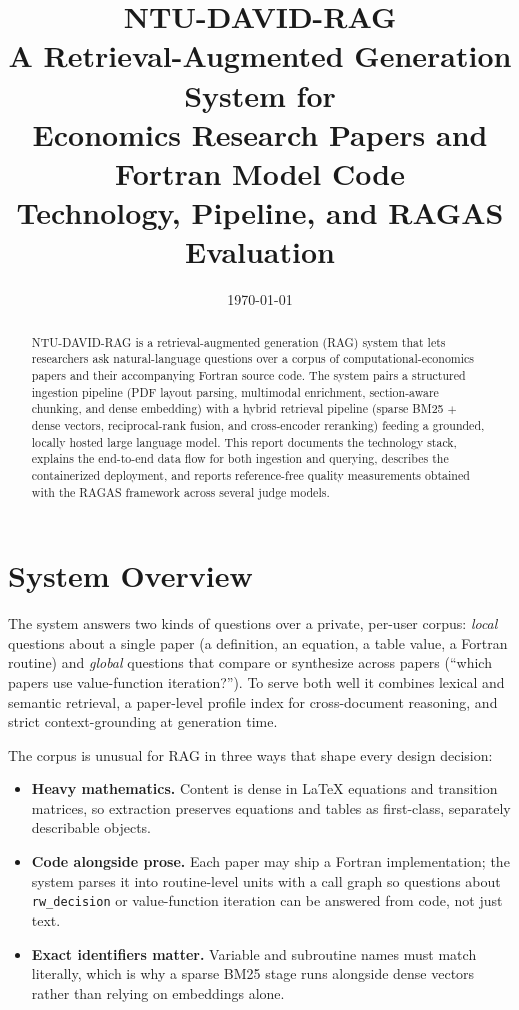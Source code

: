 \documentclass[11pt,a4paper]{article}
\title{\vspace{-1.2cm}\textbf{\color{accent}NTU-DAVID-RAG}\\[2pt]
       \large A Retrieval-Augmented Generation System for\\
       Economics Research Papers and Fortran Model Code\\[6pt]
       \normalsize Technology, Pipeline, and RAGAS Evaluation}
\author{}
\date{\today}
\newcommand{\code}[1]{\texttt{\small #1}}
\begin{document}
\maketitle
\vspace{-1.0cm}

\begin{abstract}
\noindent
NTU-DAVID-RAG is a retrieval-augmented generation (RAG) system that lets
researchers ask natural-language questions over a corpus of computational-economics
papers and their accompanying Fortran source code. The system pairs a structured
ingestion pipeline (PDF layout parsing, multimodal enrichment, section-aware
chunking, and dense embedding) with a hybrid retrieval pipeline (sparse BM25
$+$ dense vectors, reciprocal-rank fusion, and cross-encoder reranking) feeding a
grounded, locally hosted large language model. This report documents the
technology stack, explains the end-to-end data flow for both ingestion and
querying, describes the containerized deployment, and reports reference-free
quality measurements obtained with the RAGAS framework across several judge
models.
\end{abstract}

\tableofcontents
\vspace{0.4cm}

\section{System Overview}
The system answers two kinds of questions over a private, per-user corpus:
\emph{local} questions about a single paper (a definition, an equation, a table
value, a Fortran routine) and \emph{global} questions that compare or synthesize
across papers (``which papers use value-function iteration?''). To serve both
well it combines lexical and semantic retrieval, a paper-level profile index for
cross-document reasoning, and strict context-grounding at generation time.

The corpus is unusual for RAG in three ways that shape every design decision:

\begin{itemize}[leftmargin=1.4em,itemsep=2pt]
  \item \textbf{Heavy mathematics.} Content is dense in LaTeX equations and
        transition matrices, so extraction preserves equations and tables as
        first-class, separately describable objects.
  \item \textbf{Code alongside prose.} Each paper may ship a Fortran
        implementation; the system parses it into routine-level units with a
        call graph so questions about \code{rw\_decision} or value-function
        iteration can be answered from code, not just text.
  \item \textbf{Exact identifiers matter.} Variable and subroutine names must
        match literally, which is why a sparse BM25 stage runs alongside dense
        vectors rather than relying on embeddings alone.
\end{itemize}
\end{document}
